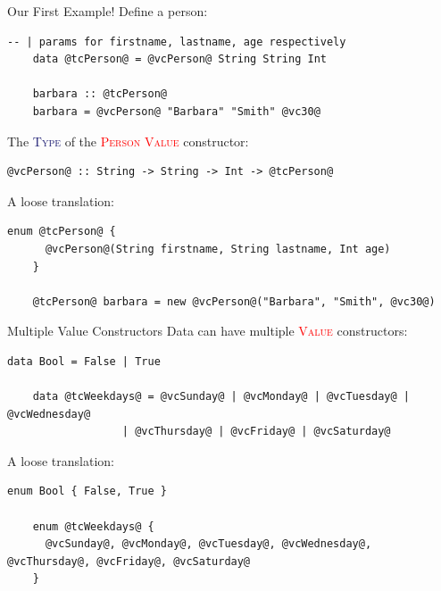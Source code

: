 \documentclass[xcolor={usenames,dvipsnames}]{beamer}
\newcommand{\htycon}[1]{\textcolor{MidnightBlue}{\textsc{#1}}}
\newcommand{\hvalcon}[1]{\textcolor{Red}{\textsc{#1}}}
\begin{document}
\begin{frame}[fragile]{Our First Example!}
  Define a person:
  \begin{lstlisting}[style=hask]
    -- | params for firstname, lastname, age respectively
    data @tcPerson@ = @vcPerson@ String String Int

    barbara :: @tcPerson@
    barbara = @vcPerson@ "Barbara" "Smith" @vc30@
  \end{lstlisting}

  The \htycon{Type} of the \hvalcon{Person Value} constructor:
  \begin{lstlisting}[style=hask]
    @vcPerson@ :: String -> String -> Int -> @tcPerson@
  \end{lstlisting}

  A loose translation:
  \begin{lstlisting}[style=hask]
    enum @tcPerson@ {
      @vcPerson@(String firstname, String lastname, Int age)
    }

    @tcPerson@ barbara = new @vcPerson@("Barbara", "Smith", @vc30@)
  \end{lstlisting}
\end{frame}

\begin{frame}[fragile]{Multiple Value Constructors}
  Data can have multiple \hvalcon{Value} constructors:
  \begin{lstlisting}[style=hask]
    data Bool = False | True

    data @tcWeekdays@ = @vcSunday@ | @vcMonday@ | @vcTuesday@ | @vcWednesday@
                  | @vcThursday@ | @vcFriday@ | @vcSaturday@
  \end{lstlisting}

  A loose translation:
  \begin{lstlisting}[style=hask]
    enum Bool { False, True }

    enum @tcWeekdays@ {
      @vcSunday@, @vcMonday@, @vcTuesday@, @vcWednesday@, @vcThursday@, @vcFriday@, @vcSaturday@
    }
  \end{lstlisting}
\end{frame}
\end{document}
